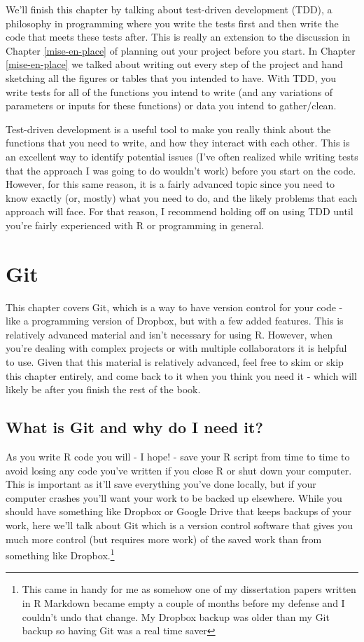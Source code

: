\documentclass[
]{krantz}
\begin{document}
We'll finish this chapter by talking about test-driven
development (TDD), a philosophy in programming where you
write the tests first and then write the code that meets
these tests after. This is really an extension to the
discussion in Chapter \ref{mise-en-place} of planning out
your project before you start. In Chapter
\ref{mise-en-place} we talked about writing out every step
of the project and hand sketching all the figures or tables
that you intended to have. With TDD, you write tests for all
of the functions you intend to write (and any variations of
parameters or inputs for these functions) or data you intend
to gather/clean.

Test-driven development is a useful tool to make you really
think about the functions that you need to write, and how
they interact with each other. This is an excellent way to
identify potential issues (I've often realized while writing
tests that the approach I was going to do wouldn't work)
before you start on the code. However, for this same reason,
it is a fairly advanced topic since you need to know exactly
(or, mostly) what you need to do, and the likely problems
that each approach will face. For that reason, I recommend
holding off on using TDD until you're fairly experienced
with R or programming in general.

\hypertarget{git}{%
\chapter{Git}\label{git}}

This chapter covers Git, which is a way to have version
control for your code - like a programming version of
Dropbox, but with a few added features. This is relatively
advanced material and isn't necessary for using R. However,
when you're dealing with complex projects or with multiple
collaborators it is helpful to use. Given that this material
is relatively advanced, feel free to skim or skip this
chapter entirely, and come back to it when you think you
need it - which will likely be after you finish the rest of
the book.

\hypertarget{what-is-git-and-why-do-i-need-it}{%
\section{What is Git and why do I need
it?}\label{what-is-git-and-why-do-i-need-it}}

As you write R code you will - I hope! - save your R script
from time to time to avoid losing any code you've written if
you close R or shut down your computer. This is important as
it'll save everything you've done locally, but if your
computer crashes you'll want your work to be backed up
elsewhere. While you should have something like Dropbox or
Google Drive that keeps backups of your work, here we'll
talk about Git which is a version control software that
gives you much more control (but requires more work) of the
saved work than from something like Dropbox.\footnote{This
  came in handy for me as somehow one of my dissertation
  papers written in R Markdown became empty a couple of
  months before my defense and I couldn't undo that change.
  My Dropbox backup was older than my Git backup so having
  Git was a real time saver}
\end{document}
